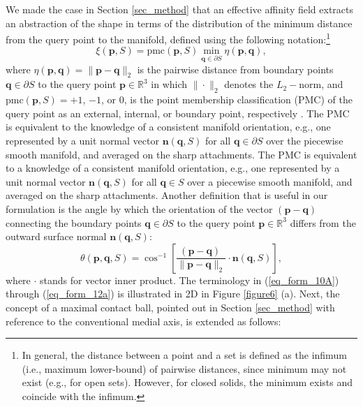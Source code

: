 \documentclass[article]{gmp2014}
\theoremstyle{definition}
\begin{document}
We made the case in Section \ref{sec_method} that an effective affinity field extracts an abstraction of the shape in terms of the distribution of the minimum distance from the query point to the manifold, defined using the following notation:\footnote{In general, the distance between a point and a set is defined as the infimum (i.e., maximum lower-bound) of pairwise distances, since minimum may not exist (e.g., for open sets). However, for closed solids, the minimum exists and coincide with the infimum.}
%
\begin{equation}
    \xi(\mathbf{p}, S) = \mathrm{pmc}(\mathbf{p}, S) \min_{\mathbf{q} \in \partial S} \eta(\mathbf{p}, \mathbf{q}), \label{eq_form_10A}
\end{equation}
%
where $\eta(\mathbf{p}, \mathbf{q}) = \| \mathbf{p}- \mathbf{q} \|_2$ is the pairwise distance from boundary points $\mathbf{q} \in \partial S$ to the query point $\mathbf{p} \in \mathds{R}^3$ in which $\| \cdot \|_2$ denotes the $L_2-$norm, and $\mathrm{pmc}(\mathbf{p}, S) = +1$, $-1$, or $0$, is the point membership classification (PMC) of the query point as an external, internal, or boundary point, respectively \cite{Tilove1980a}. The PMC is equivalent to the knowledge of a consistent manifold orientation, e.g., one represented by a unit normal vector $\mathbf{n}(\mathbf{q}, S)$ for all $\mathbf{q} \in \partial S$ over the piecewise smooth manifold, and averaged on the sharp attachments.
%
The PMC is equivalent to a knowledge of a consistent manifold orientation, e.g., one represented by a unit normal vector $\mathbf{n}(\mathbf{q}, S)$ for all $\mathbf{q} \in S$ over a piecewise smooth manifold, and averaged on the sharp attachments.
%
Another definition that is useful in our formulation is the angle by which the orientation of the vector $(\mathbf{p} - \mathbf{q})$ connecting the boundary points $\mathbf{q} \in \partial S$ to the query point $\mathbf{p} \in \mathds{R}^3$ differs from the outward surface normal $\mathbf{n}(\mathbf{q}, S)$:
%
\begin{equation}
    \theta(\mathbf{p}, \mathbf{q}, S) = \cos^{-1} \left[ \frac{(\mathbf{p} - \mathbf{q})~}{\| \mathbf{p}- \mathbf{q} \|_2} \cdot \mathbf{n}(\mathbf{q}, S) \right], \label{eq_form_12a}
\end{equation}
%
where $\cdot$ stands for vector inner product.
%
The terminology in (\ref{eq_form_10A}) through (\ref{eq_form_12a}) is illustrated in 2D in Figure \ref{figure6} (a). Next, the concept of a maximal contact ball, pointed out in Section \ref{sec_method} with reference to the conventional medial axis, is extended as follows:
\end{document}
